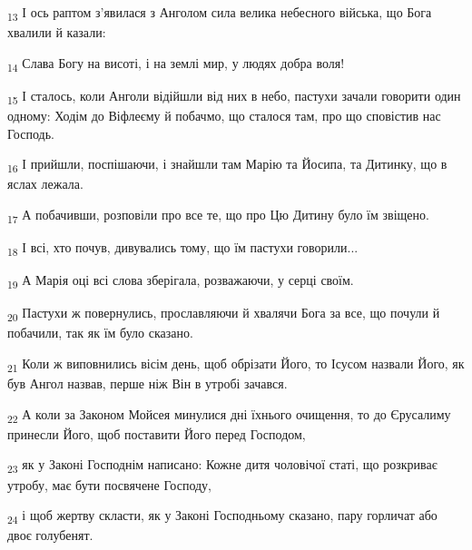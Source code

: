 \begin{tcolorbox}
\textsubscript{13} І ось раптом з'явилася з Анголом сила велика небесного війська, що Бога хвалили й казали:
\end{tcolorbox}
\begin{tcolorbox}
\textsubscript{14} Слава Богу на висоті, і на землі мир, у людях добра воля!
\end{tcolorbox}
\begin{tcolorbox}
\textsubscript{15} І сталось, коли Анголи відійшли від них в небо, пастухи зачали говорити один одному: Ходім до Віфлеєму й побачмо, що сталося там, про що сповістив нас Господь.
\end{tcolorbox}
\begin{tcolorbox}
\textsubscript{16} І прийшли, поспішаючи, і знайшли там Марію та Йосипа, та Дитинку, що в яслах лежала.
\end{tcolorbox}
\begin{tcolorbox}
\textsubscript{17} А побачивши, розповіли про все те, що про Цю Дитину було їм звіщено.
\end{tcolorbox}
\begin{tcolorbox}
\textsubscript{18} І всі, хто почув, дивувались тому, що їм пастухи говорили...
\end{tcolorbox}
\begin{tcolorbox}
\textsubscript{19} А Марія оці всі слова зберігала, розважаючи, у серці своїм.
\end{tcolorbox}
\begin{tcolorbox}
\textsubscript{20} Пастухи ж повернулись, прославляючи й хвалячи Бога за все, що почули й побачили, так як їм було сказано.
\end{tcolorbox}
\begin{tcolorbox}
\textsubscript{21} Коли ж виповнились вісім день, щоб обрізати Його, то Ісусом назвали Його, як був Ангол назвав, перше ніж Він в утробі зачався.
\end{tcolorbox}
\begin{tcolorbox}
\textsubscript{22} А коли за Законом Мойсея минулися дні їхнього очищення, то до Єрусалиму принесли Його, щоб поставити Його перед Господом,
\end{tcolorbox}
\begin{tcolorbox}
\textsubscript{23} як у Законі Господнім написано: Кожне дитя чоловічої статі, що розкриває утробу, має бути посвячене Господу,
\end{tcolorbox}
\begin{tcolorbox}
\textsubscript{24} і щоб жертву скласти, як у Законі Господньому сказано, пару горличат або двоє голубенят.
\end{tcolorbox}
